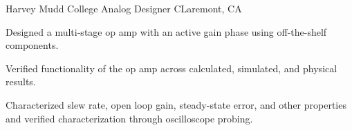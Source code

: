   \begin{cventry}
    {Harvey Mudd College} %
    {Analog Designer} %
    {CLaremont, CA} %
    {} %
    {
      \begin{cvitems} %
        \item {
        Designed a multi-stage op amp with an active gain phase using off-the-shelf components.
        }
        \item {
        Verified functionality of the op amp across calculated, simulated, and physical results.
        }
        \item {
        Characterized slew rate, open loop gain, steady-state error, and other properties and verified characterization through oscilloscope probing.
        }
      \end{cvitems}
    }
  \end{cventry}
